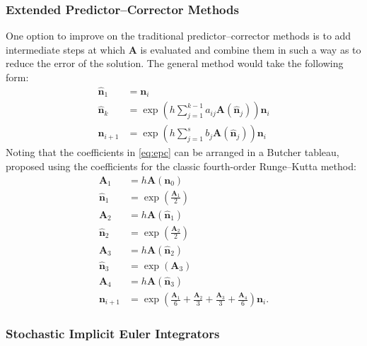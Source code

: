 \documentclass[3p,authoryear]{elsarticle}
\newcommand{\vect}[1]{\mathbf{#1}} %
\begin{document}
\subsubsection{Extended Predictor--Corrector Methods}

One option to improve on the traditional predictor--corrector methods is to add
intermediate steps at which $\vect{A}$ is evaluated and combine them in such a
way as to reduce the error of the solution. The general method would take the
following form:
\begin{equation}
  \label{eq:epc}
  \begin{split}
    \hat{\vect{n}}_1 &= \vect{n}_i \\
    \hat{\vect{n}}_k &= \exp \left( h \sum_{j=1}^{k-1} a_{ij} \vect{A}(\hat{\vect{n}}_j) \right) \vect{n}_i \\
    \vect{n}_{i+1} &= \exp \left( h \sum_{j=1}^{s} b_{j} \vect{A}(\hat{\vect{n}}_j) \right) \vect{n}_i
  \end{split}
\end{equation}
Noting that the coefficients in \cref{eq:epc} can be arranged in a Butcher
tableau, \citet{josey2016jcp} proposed using the coefficients for the classic
fourth-order Runge--Kutta method:
\begin{equation}
  \begin{split}
    \vect{A}_1 &= h\vect{A}(\vect{n}_0) \\
    \hat{\vect{n}}_1 &= \exp \left ( \frac{\vect{A}_1}{2} \right ) \\
    \vect{A}_2 &= h\vect{A}(\hat{\vect{n}}_1) \\
    \hat{\vect{n}}_2 &= \exp \left ( \frac{\vect{A}_2}{2} \right ) \\
    \vect{A}_3 &= h \vect{A}(\hat{\vect{n}}_2) \\
    \hat{\vect{n}}_3 &= \exp \left ( \vect{A}_3 \right ) \\
    \vect{A}_4 &= h\vect{A}(\hat{\vect{n}}_3) \\
    \vect{n}_{i+1} &= \exp \left ( \frac{\vect{A}_1}{6} + \frac{\vect{A}_2}{3}
      + \frac{\vect{A}_3}{3} + \frac{\vect{A}_4}{6} \right ) \vect{n}_i.
  \end{split}
\end{equation}

\subsubsection{Stochastic Implicit Euler Integrators}
\end{document}
